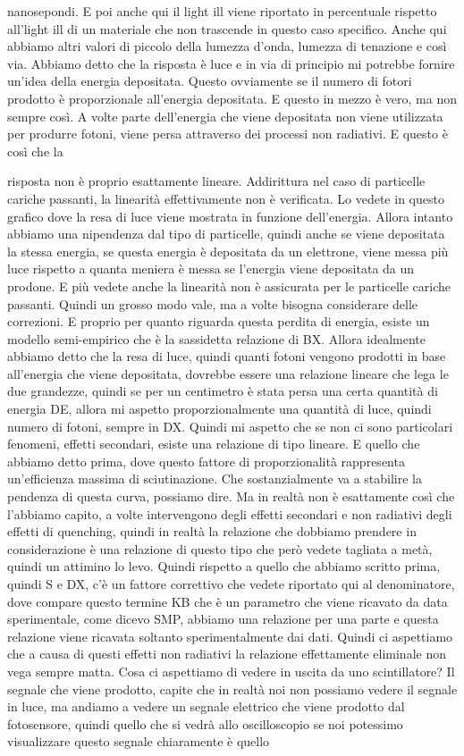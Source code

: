 {nanosepondi. E poi anche qui il light ill viene riportato in percentuale rispetto all'light ill di un materiale che non trascende in questo caso specifico. Anche qui abbiamo altri valori di piccolo della lumezza d'onda, lumezza di tenazione e così via. Abbiamo detto che la risposta è luce e in via di principio mi potrebbe fornire un'idea della energia depositata. Questo ovviamente se il numero di fotori prodotto è proporzionale all'energia depositata. E questo in mezzo è vero, ma non sempre così. A volte parte dell'energia che viene depositata non viene utilizzata per produrre fotoni, viene persa attraverso dei processi non radiativi. E questo è così che la 

risposta non è proprio esattamente lineare. Addirittura nel caso di particelle cariche passanti, la linearità effettivamente non è verificata. Lo vedete in questo grafico dove la resa di luce viene mostrata in funzione dell'energia. Allora intanto abbiamo una nipendenza dal tipo di particelle, quindi anche se viene depositata la stessa energia, se questa energia è depositata da un elettrone, viene messa più luce rispetto a quanta meniera è messa se l'energia viene depositata da un prodone. E più vedete anche la linearità non è assicurata per le particelle cariche passanti. Quindi un grosso modo vale, ma a volte bisogna considerare delle correzioni. E proprio per quanto riguarda questa perdita di energia, esiste un modello semi-empirico che è la sassidetta relazione di BX. Allora idealmente abbiamo detto che la resa di luce, quindi quanti fotoni vengono prodotti in base all'energia che viene depositata, dovrebbe essere una relazione lineare che lega le due grandezze, quindi se per un centimetro è stata persa una certa quantità di energia DE, allora mi aspetto proporzionalmente una quantità di luce, quindi numero di fotoni, sempre in DX. Quindi mi aspetto che se non ci sono particolari fenomeni, effetti secondari, esiste una relazione di tipo lineare. E quello che abbiamo detto prima, dove questo fattore di proporzionalità rappresenta un'efficienza massima di sciutinazione. Che sostanzialmente va a stabilire la pendenza di questa curva, possiamo dire. Ma in realtà non è esattamente così che l'abbiamo capito, a volte intervengono degli effetti secondari e non radiativi degli effetti di quenching, quindi in realtà la relazione che dobbiamo prendere in considerazione è una relazione di questo tipo che però vedete tagliata a metà, quindi un attimino lo levo. Quindi rispetto a quello che abbiamo scritto prima, quindi S e DX, c'è un fattore correttivo che vedete riportato qui al denominatore, dove compare questo termine KB che è un parametro che viene ricavato da data sperimentale, come dicevo SMP, abbiamo una relazione per una parte e questa relazione viene ricavata soltanto sperimentalmente dai dati. Quindi ci aspettiamo che a causa di questi effetti non radiativi la relazione effettamente eliminale non vega sempre matta. Cosa ci aspettiamo di vedere in uscita da uno scintillatore? Il segnale che viene prodotto, capite che in realtà noi non possiamo vedere il segnale in luce, ma andiamo a vedere un segnale elettrico che viene prodotto dal fotosensore, quindi quello che si vedrà allo oscilloscopio se noi potessimo visualizzare questo segnale chiaramente è quello }
